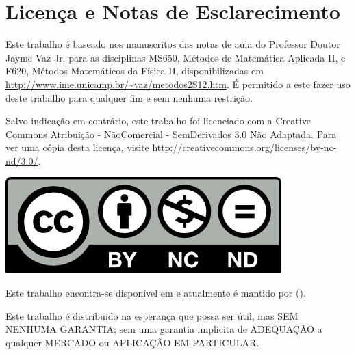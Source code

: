 % 
% 
% 
% 
% 
%
%
\chapter{Licen\c{c}a e Notas de Esclarecimento}
Este trabalho \'{e} baseado nos manuscritos das notas de aula do Professor Doutor Jayme Vaz Jr. para as disciplinas MS650, M\'{e}todos de Matem\'{a}tica Aplicada II, e F620, M\'{e}todos Matem\'{a}ticos da F\'{i}sica II, disponibilizadas em \url{http://www.ime.unicamp.br/~vaz/metodos2S12.htm}. \'{E} permitido a este fazer uso deste trabalho para qualquer fim e sem nenhuma restri\c{c}\~{a}o.

Salvo indica\c{c}\~{a}o em contr\'{a}rio, este trabalho foi licenciado com a Creative Commons Atribui\c{c}\~{a}o - N\~{a}oComercial - SemDerivados 3.0 N\~{a}o Adaptada. Para ver uma c\'{o}pia desta licen\c{c}a, visite \url{http://creativecommons.org/licenses/by-nc-nd/3.0/}.
\begin{center}
    \includegraphics[keepaspectratio=true]{cc-by-nc-nd.png}
\end{center}

Este trabalho encontra-se dispon\'{i}vel em  e atualmente \'{e} mantido por  ().

Este trabalho \'{e} distribuido na esperança que possa ser \'{u}til, mas SEM NENHUMA GARANTIA; sem uma garantia implicita de ADEQUA\c{C}\~{A}O a qualquer MERCADO ou APLICA\c{C}\~{A}O EM PARTICULAR.
